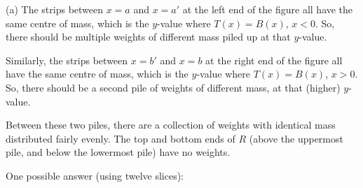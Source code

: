 \begin{answer}
(a) The strips between $x=a$ and $x=a'$ at the left end of the figure all
 have the same centre of mass, which is the $y$-value where $T(x)=B(x)$, $x<0$. So, there should be multiple weights of different mass piled up at that $y$-value.

  Similarly, the strips between $x=b'$ and $x=b$ at the right end of the figure all
  have the same centre of mass, which is the $y$-value where $T(x)=B(x)$, $x>0$. So, there should be a second pile of weights of different mass, at that (higher) $y$-value.

Between these two piles, there are a collection of weights with identical mass distributed fairly evenly. The top and bottom ends of $R$ (above the uppermost pile, and below the lowermost pile) have no weights.

One possible answer (using twelve slices):

\begin{center}
\end{center}
\end{answer}
